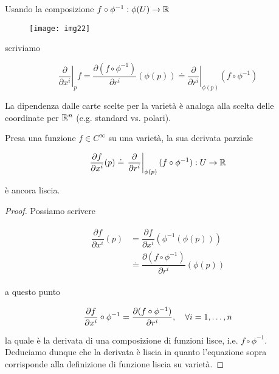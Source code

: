 Usando la composizione $ f \circ \phi^{-1} : \phi(U) \to \mathbb{R} $

\begin{figure}[H]
	\centering
	\texttt{[image: img22]}
\end{figure}

scriviamo

\begin{equation}
	\left. \dfrac{\partial}{\partial x^{i}} \right|_{p} f = \dfrac{\partial (f \circ \phi^{-1})}{\partial r^{i}} (\phi(p)) \doteq \left. \dfrac{\partial}{\partial r^{i}} \right|_{\phi(p)} (f \circ \phi^{-1})
\end{equation}

La dipendenza dalle carte scelte per la varietà è analoga alla scelta delle coordinate per $ \mathbb{R}^{n} $ (e.g. standard vs. polari).

\begin{definition}
	Presa una funzione $ f \in C^{\infty} $ su una varietà, la sua derivata parziale
	
	\begin{equation}
		\dfrac{\partial f}{\partial x^{i}} (p) \doteq \left. \dfrac{\partial}{\partial r^{i}} \right|_{\phi(p)} (f \circ \phi^{-1}) : U \to \mathbb{R}
	\end{equation}

	è ancora liscia.
\end{definition}

\begin{proof}
	Possiamo scrivere
	
	\begin{align}
		\begin{split}
			\dfrac{\partial f}{\partial x^{i}} (p) &= \dfrac{\partial f}{\partial x^{i}} (\phi^{-1}(\phi(p)))\\
			&\doteq \dfrac{\partial (f \circ \phi^{-1})}{\partial r^{i}} (\phi(p))
		\end{split}
	\end{align}

	a questo punto
	
	\begin{equation}
		\pdv{f}{x^{i}} \circ \phi^{-1} = \pdv{(f \circ \phi^{-1})}{r^{i}} \qcomma \forall i=1,\dots,n
	\end{equation}

	la quale è la derivata di una composizione di funzioni lisce, i.e. $ f \circ \phi^{-1} $. Deduciamo dunque che la derivata è liscia in quanto l'equazione sopra corrisponde alla definizione di funzione liscia su varietà.
\end{proof}

